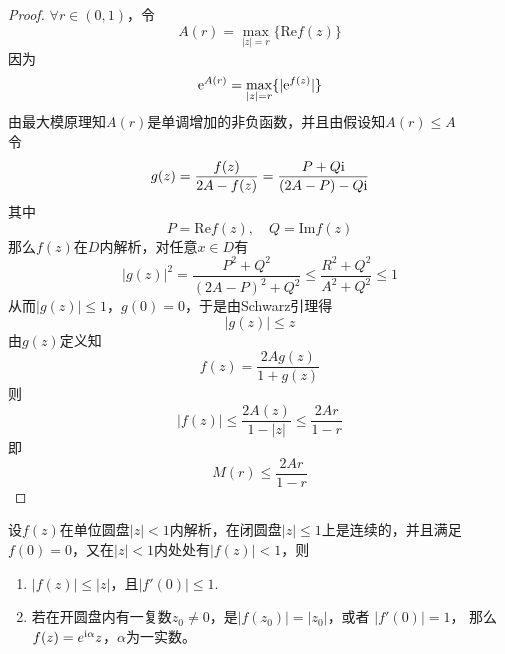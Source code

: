 \begin{proof}
    
    $\forall r \in (0, 1)$，令
    $$A(r) = \max_{|z| = r}\{\mathrm{Re}f(z)\}$$
    因为
    $$\mathrm{e}^{A(r)} = \max_{|z| = r}\{|\mathrm{e}^{f(z)}|\}$$
    由最大模原理知$A(r)$是单调增加的非负函数，并且由假设知$A(r) \leq A$ \\
    令
    $$ g(z) = \dfrac{f(z)}{2A - f(z)} = \dfrac{P + Q\mathrm{i}}{(2A - P) - Q\mathrm{i}} $$
    其中
    $$ P = \mathrm{Re}f(z), \quad Q = \mathrm{Im}f(z) $$
    那么$f(z)$在$D$内解析，对任意$x \in D$有
    $$|g(z)|^2 = \dfrac{P^2 + Q^2}{(2A - P)^2 + Q^2} \leq \dfrac{R^2 + Q^2}{A^2 + Q^2} \leq 1$$
    从而$|g(z)| \leq 1$，$g(0) = 0$，于是由\textup{Schwarz}引理得
    $$|g(z) | \leq z$$
    由$g(z)$定义知
    $$f(z) = \dfrac{2Ag(z)}{1 + g(z)}$$
    则
    $$ |f(z)| \leq \dfrac{2A(z)}{1 - |z|} \leq \dfrac{2Ar}{1 - r}$$
    即
    $$M(r) \leq \dfrac{2Ar}{1 - r}$$

\end{proof}

\begin{lemma}[Schwarz引理]
    
    设$f(z)$在单位圆盘$|z| < 1$内解析，在闭圆盘$|z| \leq 1$上是连续的，并且满足$f(0) = 0$，又在$|z| < 1$内处处有$|f(z)| < 1$，则

    \begin{enumerate}
        
        \item $|f(z)| \leq |z|$，且$|f'(0)| \leq 1$.
            
        \item 
            若在开圆盘内有一复数$z_0 \neq 0$，是$|f(z_0)| = |z_0|$，或者 $|f'(0)| = 1$，
            那么$f(z) = e^{\mathrm{i}\alpha}z$，$\alpha$为一实数。
        
    \end{enumerate}

\end{lemma}

